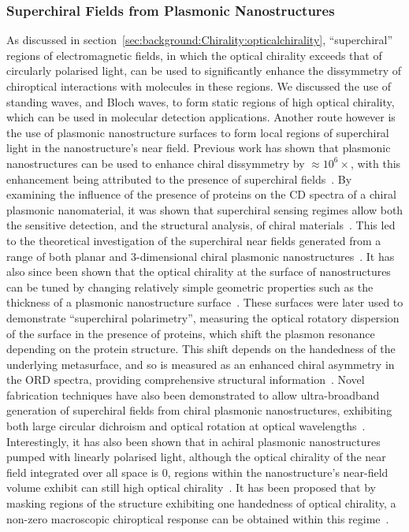 \subsubsection{Superchiral Fields from Plasmonic Nanostructures} \label{sec:background:Plasmonics:superchiral}
As discussed in section~\ref{sec:background:Chirality:opticalchirality}, ``superchiral'' regions of electromagnetic fields, in which the optical chirality exceeds that of circularly polarised light, can be used to significantly enhance the dissymmetry of chiroptical interactions with molecules in these regions. We discussed the use of standing waves, and Bloch waves, to form static regions of high optical chirality, which can be used in molecular detection applications. 
Another route however is the use of plasmonic nanostructure surfaces to form local regions of superchiral light in the nanostructure's near field. Previous work has shown that plasmonic nanostructures can be used to enhance chiral dissymmetry by $\approx 10^6 \times$, with this enhancement being attributed to the presence of superchiral fields~\cite{Hendry2010}. By examining the influence of the presence of proteins on the CD spectra of a chiral plasmonic nanomaterial, it was shown that superchiral sensing regimes allow both the sensitive detection, and the structural analysis, of chiral materials~\cite{Hendry2010}. This led to the theoretical investigation of the superchiral near fields generated from a range of both planar and 3-dimensional chiral plasmonic nanostructures~\cite{Schaferling2012}. 
It has also since been shown that the optical chirality at the surface of nanostructures can be tuned by changing relatively simple geometric properties such as the thickness of a plasmonic nanostructure surface~\cite{Karimullah2015}. These surfaces were later used to demonstrate ``superchiral polarimetry'', measuring the optical rotatory dispersion of the surface in the presence of proteins, which shift the plasmon resonance depending on the protein structure. This shift depends on the handedness of the underlying metasurface, and so is measured as an enhanced chiral asymmetry in the ORD spectra, providing comprehensive structural information~\cite{Tullius2015}. 
Novel fabrication techniques have also been demonstrated to allow ultra-broadband generation of superchiral fields from chiral plasmonic nanostructures, exhibiting both large circular dichroism and optical rotation at optical wavelengths~\cite{Hou2016}. 
Interestingly, it has also been shown that in achiral plasmonic nanostructures pumped with linearly polarised light, although the optical chirality of the near field integrated over all space is $0$, regions within the nanostructure's near-field volume exhibit can still high optical chirality~\cite{Schaferling2012a, Davis2013}. It has been proposed that by masking regions of the structure exhibiting one handedness of optical chirality, a non-zero macroscopic chiroptical response can be obtained within this regime~\cite{Schaferling2012a}. 
